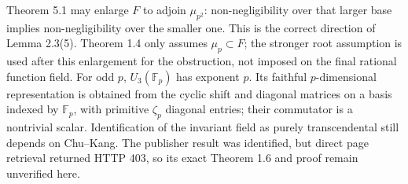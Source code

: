 \documentclass[10pt]{article}
\begin{document}
Theorem 5.1 may enlarge \(F\) to adjoin \(\mu_{p^2}\): non-negligibility over that larger base implies non-negligibility over the smaller one. This is the correct direction of Lemma 2.3(5). Theorem 1.4 only assumes \(\mu_p\subset F\); the stronger root assumption is used after this enlargement for the obstruction, not imposed on the final rational function field. For odd \(p\), \(U_3(\mathbb F_p)\) has exponent \(p\). Its faithful \(p\)-dimensional representation is obtained from the cyclic shift and diagonal matrices on a basis indexed by \(\mathbb F_p\), with primitive \(\zeta_p\) diagonal entries; their commutator is a nontrivial scalar. Identification of the invariant field as purely transcendental still depends on Chu–Kang. The publisher result was identified, but direct page retrieval returned HTTP 403, so its exact Theorem 1.6 and proof remain unverified here.\par
\end{document}
